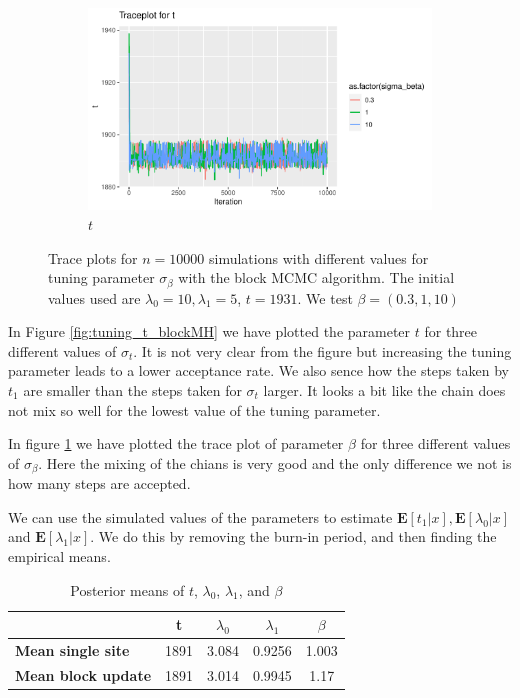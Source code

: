 \begin{figure}[H]
\begin{subfigure}[b]{0.49\textwidth}
    \end{subfigure}
    \begin{subfigure}[b]{0.49\textwidth}
        \centering
        \includegraphics[width = \textwidth]{Images/tuning_t_block_beta.pdf}
        \caption{$t$}

    \end{subfigure}
     \caption{Trace plots for $n = 10000$ simulations with different values for tuning parameter $\sigma_{\beta}$ with the block MCMC algorithm. The initial values used are $\lambda_0 = 10, \lambda_1 = 5$, $t = 1931$. We test $\beta = (0.3, 1, 10)$ }
    \label{fig:tuning_beta_blockMH}
\end{figure}


 In Figure \ref{fig:tuning_t_blockMH} we have plotted the parameter $t$  for three different values of $\sigma_t$. It is not very clear from the figure but increasing the tuning parameter leads to a lower acceptance rate. We also sence how the steps taken by $t_1$ are smaller than the steps taken for $\sigma_t$ larger. It looks a bit like the chain does not mix so well for the lowest value of the tuning parameter. 
 
 In figure \ref{fig:tuning_beta_blockMH} we have plotted the trace plot of parameter $\beta$ for three different values of $\sigma_{\beta}$. Here the mixing of the chians is very good and the only difference we not is how many steps are accepted. 

We can use the simulated values of the parameters to estimate $\mathbf{E}[t_1|x], \mathbf{E}[\lambda_0|x]$ and $\mathbf{E}[\lambda_1|x]$. We do this by removing the burn-in period, and then finding the empirical means. 


\begin{table}[]
\centering
\begin{tabular}{lcccc}
                           & \textbf{t} & \textbf{$\lambda_0$} & \textbf{$\lambda_1$} & \textbf{$\beta$} \\ \hline
\textbf{Mean single site}  & 1891       & 3.084              & 0.9256             & 1.003         \\
\textbf{Mean block update} & 1891       & 3.014              & 0.9945             & 1.17         
\end{tabular}
\caption{Posterior means of $t$, $\lambda_0$, $\lambda_1$, and $\beta$}
\label{tab:mean}
\end{table}


